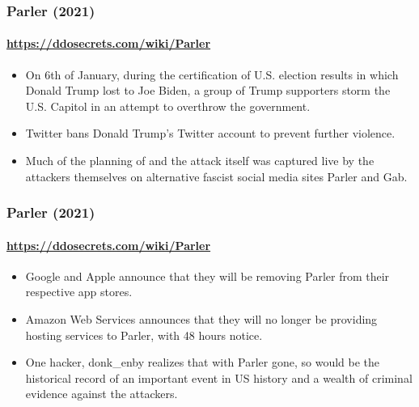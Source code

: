 \documentclass[aspectratio=169,usenames,dvipsnames]{beamer}
\begin{document}
\begin{frame}
  \frametitle{Parler (2021)}
  \framesubtitle{\url{https://ddosecrets.com/wiki/Parler}}

  \begin{itemize}[<+->]
    \item On 6th of January, during the certification of U.S. election results
      in which Donald Trump lost to Joe Biden, a group of Trump supporters
      storm the U.S. Capitol in an attempt to overthrow the government.
    \item Twitter bans Donald Trump's Twitter account to prevent further
      violence.
    \item Much of the planning of and the attack itself was captured live by
      the attackers themselves on alternative fascist social media sites
      Parler and Gab.
  \end{itemize}
\end{frame}

\begin{frame}
  \frametitle{Parler (2021)}
  \framesubtitle{\url{https://ddosecrets.com/wiki/Parler}}

  \begin{itemize}[<+->]
    \item Google and Apple announce that they will be removing Parler from
      their respective app stores.
    \item Amazon Web Services announces that they will no longer be providing
      hosting services to Parler, with 48 hours notice.
    \item One hacker, donk\_enby realizes that with Parler gone, so would be
      the historical record of an important event in US history and a wealth
      of criminal evidence against the attackers.
  \end{itemize}

\end{frame}
\end{document}
